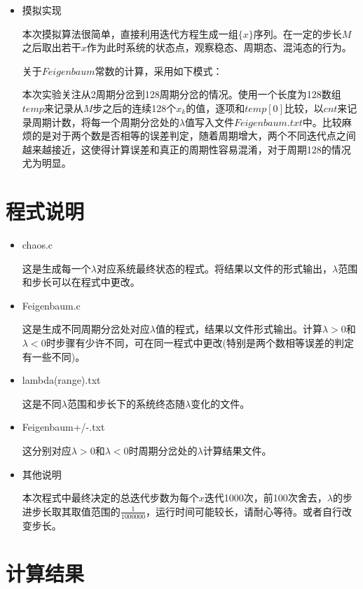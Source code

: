 \documentclass[UTF8]{ctexart}
\begin{document}
\begin{itemize}
		\item 摸拟实现
		
		本次摸拟算法很简单，直接利用迭代方程生成一组$\{x\}$序列。在一定的步长$M$之后取出若干$x$作为此时系统的状态点，观察稳态、周期态、混沌态的行为。
		
		关于$Feigenbaum$常数的计算，采用如下模式：
	
		本次实验关注从2周期分岔到128周期分岔的情况。使用一个长度为128数组$temp$来记录从$M$步之后的连续128个$x_k$的值，逐项和$temp[0]$比较，以$cnt$来记录周期计数，将每一个周期分岔处的$\lambda$值写入文件$Feigenbaum.txt$中。比较麻烦的是对于两个数是否相等的误差判定，随着周期增大，两个不同迭代点之间越来越接近，这使得计算误差和真正的周期性容易混淆，对于周期128的情况尤为明显。
	\end{itemize}
	
	\section{程式说明}
	
	\begin{itemize}
		\item chaos.c
		
		这是生成每一个$\lambda$对应系统最终状态的程式。将结果以文件的形式输出，$\lambda$范围和步长可以在程式中更改。
		
		\item Feigenbaum.c
		
		这是生成不同周期分岔处对应$\lambda$值的程式，结果以文件形式输出。计算$\lambda>0$和$\lambda<0$时步骤有少许不同，可在同一程式中更改(特别是两个数相等误差的判定有一些不同)。
		
		\item lambda(range).txt 
		
		这是不同$\lambda$范围和步长下的系统终态随$\lambda$变化的文件。
		
		\item Feigenbaum+/-.txt
		
		这分别对应$\lambda>0$和$\lambda<0$时周期分岔处的$\lambda$计算结果文件。
		
		\item 其他说明
		
		 本次程式中最终决定的总迭代步数为每个$x$迭代1000次，前100次舍去，$\lambda$的步进步长取其取值范围的$\frac{1}{1000000}$，运行时间可能较长，请耐心等待。或者自行改变步长。
	\end{itemize}
	
	\section{计算结果}
	
\end{document}
